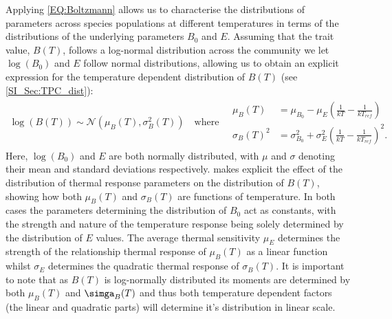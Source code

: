 \documentclass{article}
\begin{document}
Applying \cref{EQ:Boltzmann} allows us to characterise the distributions of parameters across species populations at different temperatures in terms of the distributions of the underlying parameters $B_0$ and $E$. Assuming that the trait value, $B(T)$, follows a log-normal distribution across the community we let $\log(B_0)$ and $E$ follow normal distributions, allowing us to obtain an explicit expression for the temperature dependent distribution of $B(T)$ (see \cref{SI_Sec:TPC_dist}):
\begin{align} \label{EQ:Boltz_dist}
    \log(B(T)) \sim \mathcal{N}\left(\mu_{B}(T) , \sigma_{B}^2(T) \right) 
    \quad \text{where} \quad
    \begin{array}{cc}
        \mu_B(T) &= \mu_{B_0} - \mu_{E} \left(\frac{1}{kT} - \frac{1}{k T_{ref} }\right)  \\
        \sigma_{B}(T)^2 &= \sigma_{B_0}^2 + \sigma_{E}^2 \left(\frac{1}{kT} - \frac{1}{k T_{ref} }\right)^2 .
    \end{array}
\end{align}
Here, $\log(B_0)$ and $E$ are both normally distributed, with $\mu$ and $\sigma$ denoting their mean and standard deviations respectively.  makes explicit the effect of the distribution of thermal response parameters on the distribution of $B(T)$, showing how both $\mu_B(T)$ and $\sigma_B(T)$ are functions of temperature. In both cases the parameters determining the distribution of $B_0$ act as constants, with the strength and nature of the temperature response being solely determined by the distribution of $E$ values. The average thermal sensitivity $\mu_E$ determines the strength of the relationship thermal response of $\mu_B(T)$ as a linear function whilst $\sigma_E$ determines the quadratic thermal response of $\sigma_B(T)$. It is important to note that as $B(T)$ is log-normally distributed its moments are determined by both $\mu_B(T)$ and $\simga_B(T)$ and thus both temperature dependent factors (the linear and quadratic parts) will determine it's distribution in linear scale.
\end{document}
